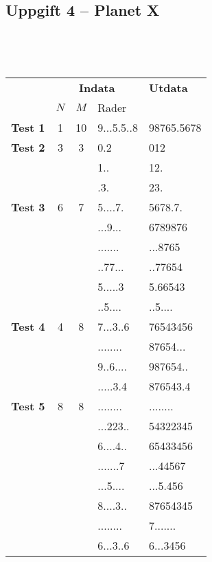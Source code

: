 \documentclass[a4paper,12pt,oneside]{amsbook}
\theoremstyle{test}
\newcommand{\fe}[1]{\textbf{#1}}            %
\begin{document}
\subsection*{Uppgift 4 -- Planet X}


~\\
{\tt 
\begin{tabular}{||l||c|c|l||l||}\hline\hline
& \multicolumn{3}{c||}{\fe{Indata}} & \fe{Utdata} \\
& $N$ & $M$ & Rader & \\ \hline \hline
\fe{Test 1} & 1 & 10 &	9...5.5..8  	&	98765.5678	\\ \hline
\fe{Test 2} & 3 & 3 & 0.2	&	012	\\
&&&	1..	&	12.	\\
&&&	.3.	&	23.	\\ \hline
\fe{Test 3} & 6 & 7 & 5....7.	&	5678.7.	\\
&&&	...9...	&	6789876	\\
&&&	.......	&	...8765	\\
&&&	..77...	&	..77654	\\
&&&	5.....3	&	5.66543	\\
&&&	..5....	&	..5....	\\ \hline
\fe{Test 4} & 4 & 8 &	7...3..6	&	76543456	\\
&&&	........	&	87654...	\\
&&&	9..6....	&	987654..	\\
&&&	.....3.4	&	876543.4	\\ \hline
\fe{Test 5} & 8 & 8 &	........	&	........	\\
&&&	...223..	&	54322345	\\
&&&	6....4..	&	65433456	\\
&&&	.......7	&	...44567	\\
&&&	...5....	&	...5.456	\\
&&&	8....3..	&	87654345	\\
&&&	........	&	7.......	\\
&&&	6...3..6	&	6...3456    	\\ \hline \hline
\end{tabular}
}
\end{document}

